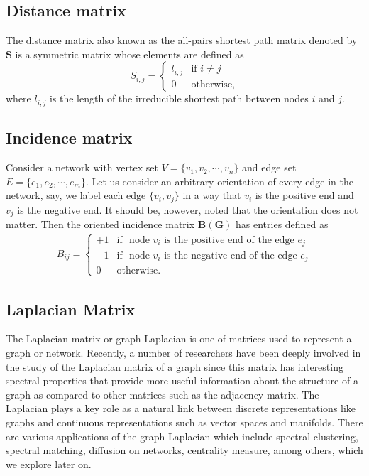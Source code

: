 \documentclass[10pt,a4paper]{article}
\theoremstyle{plain}
\theoremstyle{definition}
\begin{document}
\subsection{Distance matrix}
The distance matrix also known as the all-pairs shortest path matrix denoted by $\mathbf{S}$ is a symmetric matrix whose elements are defined as 
\begin{equation}
	S_{i,j} =  \begin{cases} l_{i,j} &\mbox{if } i \neq j \\
0 & \text{otherwise},
\end{cases}
\end{equation}
where $l_{i,j}$ is the length of the irreducible shortest path between nodes $i$ and $j$.

\subsection{Incidence matrix}
	Consider a network with vertex set $V=\{v_1,v_2, \cdots,v_n\}$ and edge set $E =\{e_1,e_2,\cdots,e_m \}$. Let us consider an arbitrary orientation of every edge in the network, say, we label each edge $\{v_i,v_j\}$ in a way that $v_i$ is the positive end and $v_j$ is the negative end. It should be, however, noted that the orientation does not matter. Then the oriented incidence matrix $\mathbf{B(G)}$ has entries defined as
	\begin{eqnarray}
	B_{ij} = \begin{cases} +1 &\mbox{if } \text{ node $v_i$ is the positive end of the edge } e_j \\
	-1 &\mbox{if }  \text{ node $v_i$ is the negative end of the edge } e_j\\
	0 & \text{otherwise}.
	\end{cases}
	\end{eqnarray}

\subsection{Laplacian Matrix}
The Laplacian matrix or graph Laplacian is one of matrices used to represent a graph or network. Recently, a number of researchers have been deeply involved in the study of the Laplacian matrix of a graph since this matrix has interesting spectral properties that provide more useful information about the structure of a graph as compared to other matrices such as the adjacency matrix. The Laplacian plays a key role as a natural link between discrete representations like graphs and continuous representations such as vector spaces and manifolds. 
There are various applications of the graph Laplacian which include spectral clustering, spectral matching, diffusion on networks, centrality measure, among others, which we explore later on. 
\end{document}
